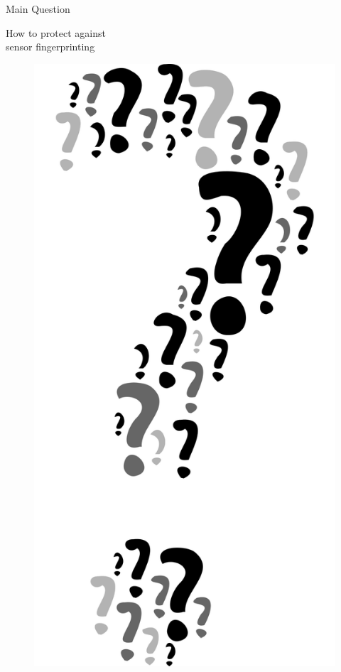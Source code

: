 \documentclass[aspectratio=169]{beamer}
[aspectratio=169] %
\begin{document}
\begin{frame}{Main Question}
  \begin{minipage}{0.525\textwidth} 
    How to protect against\\sensor fingerprinting
  \end{minipage}
  \hfill
  \begin{minipage}{0.455\textwidth} 
    \begin{figure}
      \centering
      \includegraphics[height=0.5\textheight]{figures/question.png}
    \end{figure}
  \end{minipage}
\end{frame}
\end{document}
